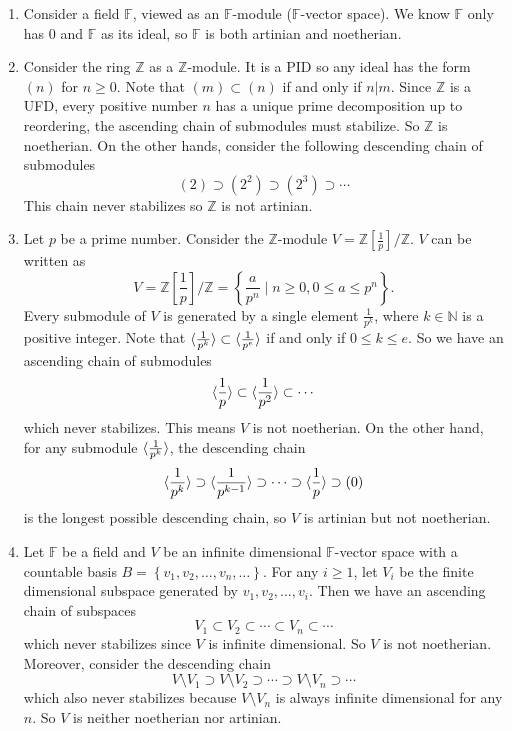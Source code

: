 \documentclass[a4paper, 12pt]{article}
\begin{document}
\begin{solution}
\begin{enumerate}[(1)]
\item Consider a field \(\mathbb{F}\), viewed as an \(\mathbb{F}\)-module (\(\mathbb{F}\)-vector space). We know \(\mathbb{F}\) only has \(0\) and \(\mathbb{F}\) as its ideal,  so \(\mathbb{F}\) is both artinian and noetherian. 
\item Consider the ring \(\mathbb{Z}\) as a \(\mathbb{Z}\)-module. It is a PID so any ideal has the form \((n)\) for \(n\geq 0\). Note that \((m)\subset (n)\) if and only if \(n|m\). Since \(\mathbb{Z}\) is a UFD, every positive number \(n\) has 
a unique prime decomposition up to reordering, the ascending chain of submodules must stabilize. So \(\mathbb{Z}\) is noetherian. On the other hands, consider the following descending chain of submodules 
\[(2)\supset (2^2)\supset (2^3)\supset \cdots\]
This chain never stabilizes so \(\mathbb{Z}\) is not artinian. 
\item Let \(p\) be a prime number. Consider the \(\mathbb{Z}\)-module \(V=\mathbb{Z}[\frac{1}{p}]/\mathbb{Z}\). \(V\) can be written as 
\[V=\mathbb{Z}[\frac{1}{p}]/\mathbb{Z}=\left\{ \frac{a}{p^n}\mid n\geq 0, 0\leq a\leq p^n\right\}.\]
Every submodule of \(V\) is generated by a single element \(\frac{1}{p^k}\), where \(k\in \mathbb{N}\) is a positive integer. Note that \(\langle \frac{1}{p^k}\rangle\subset \langle \frac{1}{p^e}\rangle\) if and only if \(0\leq k\leq e\). So we have an ascending chain of submodules 
\[\langle \frac{1}{p}\rangle\subset \langle \frac{1}{p^2}\rangle\subset \cdots\]
which never stabilizes. This means \(V\) is not noetherian. On the other hand, for any submodule \(\langle \frac{1}{p^k}\rangle\), the descending chain 
\[\langle \frac{1}{p^k}\rangle \supset \langle \frac{1}{p^{k-1}}\rangle\supset \cdots \supset \langle \frac{1}{p}\rangle\supset (0)\]
is the longest possible descending chain, so \(V\) is artinian but not noetherian.
\item Let \(\mathbb{F}\) be a field and \(V\) be an infinite dimensional \(\mathbb{F}\)-vector space with a countable basis \(B=\left\{ v_1,v_2,\ldots,v_n,\ldots \right\}\). For any \(i\geq 1\), let \(V_i\) be the 
finite dimensional subspace generated by \(v_1,v_2,\ldots,v_i\). Then we have an ascending chain of subspaces 
\[V_1\subset V_2\subset \cdots\subset V_n\subset\cdots\]
which never stabilizes since \(V\) is infinite dimensional. So \(V\) is not noetherian. Moreover, consider the descending chain 
\[V\setminus V_1\supset V\setminus V_2\supset \cdots\supset V\setminus V_n\supset \cdots\]
which also never stabilizes because \(V\setminus V_n\) is always infinite dimensional for any \(n\). So \(V\) is neither noetherian nor artinian.
\end{enumerate}
\end{solution}
\end{document}
